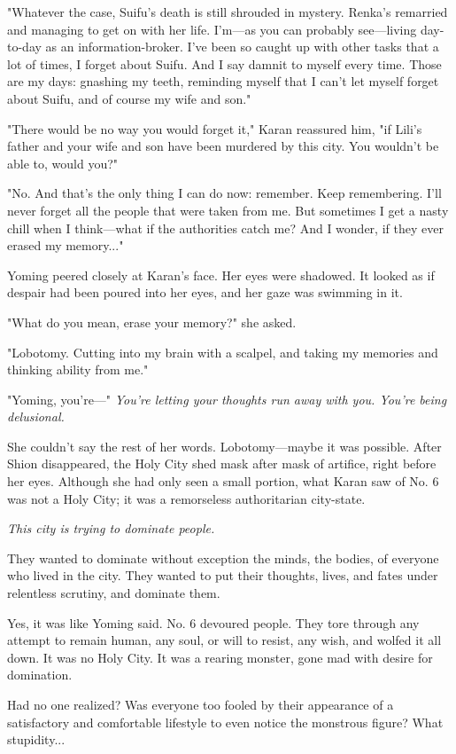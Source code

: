 "Whatever the case, Suifu's death is still shrouded in mystery. Renka's
remarried and managing to get on with her life. I'm---as you can probably
see---living day-to-day as an information-broker. I've been so caught up
with other tasks that a lot of times, I forget about Suifu. And I say
damnit to myself every time. Those are my days: gnashing my teeth,
reminding myself that I can't let myself forget about Suifu, and of
course my wife and son."

"There would be no way you would forget it," Karan reassured him, "if
Lili's father and your wife and son have been murdered by this city. You
wouldn't be able to, would you?"

"No. And that's the only thing I can do now: remember. Keep remembering.
I'll never forget all the people that were taken from me. But sometimes
I get a nasty chill when I think---what if the authorities catch me? And I
wonder, if they ever erased my memory..."

Yoming peered closely at Karan's face. Her eyes were shadowed. It looked
as if despair had been poured into her eyes, and her gaze was swimming
in it.

"What do you mean, erase your memory?" she asked.

"Lobotomy. Cutting into my brain with a scalpel, and taking my memories
and thinking ability from me."

"Yoming, you're---" \emph{You're letting your thoughts run away with you. You're
being delusional.}

She couldn't say the rest of her words. Lobotomy---maybe it was possible.
After Shion disappeared, the Holy City shed mask after mask of artifice,
right before her eyes. Although she had only seen a small portion, what
Karan saw of No. 6 was not a Holy City; it was a remorseless
authoritarian city-state.

\emph{This city is trying to dominate people.}

They wanted to dominate without exception the minds, the bodies, of
everyone who lived in the city. They wanted to put their thoughts,
lives, and fates under relentless scrutiny, and dominate them.

Yes, it was like Yoming said. No. 6 devoured people. They tore through
any attempt to remain human, any soul, or will to resist, any wish, and
wolfed it all down. It was no Holy City. It was a rearing monster, gone
mad with desire for domination.

Had no one realized? Was everyone too fooled by their appearance of a
satisfactory and comfortable lifestyle to even notice the monstrous
figure? What stupidity...

